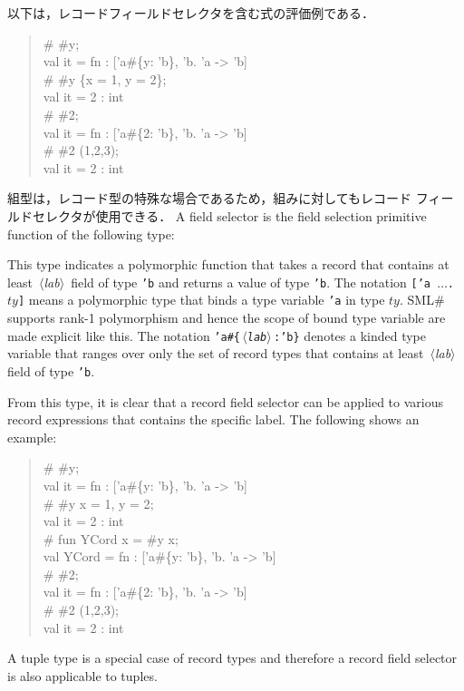 \documentclass{jbook}
\newcommand{\smlsharp}{SML\#}
\newcommand{\code}[1]{\mbox{\large\tt #1}}
\newcommand{\nonterm}[1]{\mbox{$\,\langle$}{\it #1}\mbox{$\rangle\,$}}
\newenvironment{program}{\begin{quote}\begin{tt}}%
                        {\end{tt}\end{quote}}
\begin{document}
	以下は，レコードフィールドセレクタを含む式の評価例である．
\begin{program}
\# \#y;
\\
val it = fn : ['a\#\{y: 'b\}, 'b. 'a -> 'b]
\\
\# \#y \{x = 1, y = 2\};
\\
val it = 2 : int
\\
\# \#2;
\\
val it = fn : ['a\#\{2: 'b\}, 'b. 'a -> 'b]
\\
\# \#2 (1,2,3);
\\
val it = 2 : int
\end{program}
	組型は，レコード型の特殊な場合であるため，組みに対してもレコード
フィールドセレクタが使用できる．
\else%
	A field selector is the field selection primitive function
of the following type:
\begin{program}
 ['a\#\{\nonterm{lab}:'b\}, 'b. 'a -> 'b]
\end{program}
	This type indicates a polymorphic function that takes
a record that contains at least \nonterm{lab} field of type \code{'b}
and returns a value of type \code{'b}.
	The notation \code{['a $\ldots$.$ty$]} means a polymorphic
type that binds a type variable \code{'a} in type $ty$.
	\smlsharp{} supports rank-1 polymorphism and hence the scope
of bound type variable are made explicit like this.
	The notation 
\code{'a\#\{\nonterm{lab}:'b\}} denotes a kinded type variable that
ranges over only the set of record types that contains at least
\nonterm{lab} field of type \code{'b}.

	From this type, it is clear that a record field selector can
be applied to various record expressions that contains the specific
label.
	The following shows an example:
\begin{program}
\# \#y;
\\
val it = fn : ['a\#\{y: 'b\}, 'b. 'a -> 'b]
\\
\# \#y {x = 1, y = 2};
\\
val it = 2 : int
\\
\# fun YCord x = \#y x;
\\
val YCord = fn : ['a\#\{y: 'b\}, 'b. 'a -> 'b]
\\
\# \#2;
\\
val it = fn : ['a\#\{2: 'b\}, 'b. 'a -> 'b]
\\
\# \#2 (1,2,3);
\\
val it = 2 : int
\end{program}
        A tuple type is a special case of record types and therefore
a record field selector is also applicable to tuples.
\fi%
\end{document}
